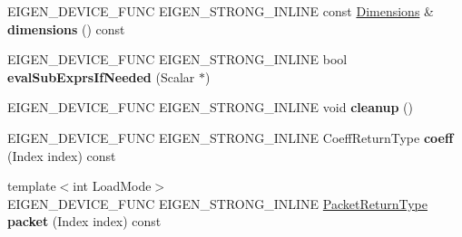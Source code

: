 \begin{DoxyCompactItemize}
E\+I\+G\+E\+N\+\_\+\+D\+E\+V\+I\+C\+E\+\_\+\+F\+U\+NC E\+I\+G\+E\+N\+\_\+\+S\+T\+R\+O\+N\+G\+\_\+\+I\+N\+L\+I\+NE const \hyperlink{struct_eigen_1_1_d_sizes}{Dimensions} \& {\bfseries dimensions} () const
\item 
\mbox{\label{struct_eigen_1_1_tensor_evaluator_3_01const_01_tensor_striding_op_3_01_strides_00_01_arg_type_01_4_00_01_device_01_4_ab84be2e9773fdede5627bd090dac8a71}} 
E\+I\+G\+E\+N\+\_\+\+D\+E\+V\+I\+C\+E\+\_\+\+F\+U\+NC E\+I\+G\+E\+N\+\_\+\+S\+T\+R\+O\+N\+G\+\_\+\+I\+N\+L\+I\+NE bool {\bfseries eval\+Sub\+Exprs\+If\+Needed} (Scalar $\ast$)
\item 
\mbox{\label{struct_eigen_1_1_tensor_evaluator_3_01const_01_tensor_striding_op_3_01_strides_00_01_arg_type_01_4_00_01_device_01_4_a6b465e8815afcedf157d39273ff60012}} 
E\+I\+G\+E\+N\+\_\+\+D\+E\+V\+I\+C\+E\+\_\+\+F\+U\+NC E\+I\+G\+E\+N\+\_\+\+S\+T\+R\+O\+N\+G\+\_\+\+I\+N\+L\+I\+NE void {\bfseries cleanup} ()
\item 
\mbox{\label{struct_eigen_1_1_tensor_evaluator_3_01const_01_tensor_striding_op_3_01_strides_00_01_arg_type_01_4_00_01_device_01_4_a55983b0ff2f42d58ad6f004ba8d0f519}} 
E\+I\+G\+E\+N\+\_\+\+D\+E\+V\+I\+C\+E\+\_\+\+F\+U\+NC E\+I\+G\+E\+N\+\_\+\+S\+T\+R\+O\+N\+G\+\_\+\+I\+N\+L\+I\+NE Coeff\+Return\+Type {\bfseries coeff} (Index index) const
\item 
\mbox{\label{struct_eigen_1_1_tensor_evaluator_3_01const_01_tensor_striding_op_3_01_strides_00_01_arg_type_01_4_00_01_device_01_4_a4c7637daf6f89f8b6043eb1f838d8c20}} 
{\footnotesize template$<$int Load\+Mode$>$ }\\E\+I\+G\+E\+N\+\_\+\+D\+E\+V\+I\+C\+E\+\_\+\+F\+U\+NC E\+I\+G\+E\+N\+\_\+\+S\+T\+R\+O\+N\+G\+\_\+\+I\+N\+L\+I\+NE \hyperlink{group___sparse_core___module}{Packet\+Return\+Type} {\bfseries packet} (Index index) const
\item 
\mbox{\label{struct_eigen_1_1_tensor_evaluator_3_01const_01_tensor_striding_op_3_01_strides_00_01_arg_type_01_4_00_01_device_01_4_a887bd412e3ef53ff4baec5032abd709a}} 

\end{DoxyCompactItemize}
